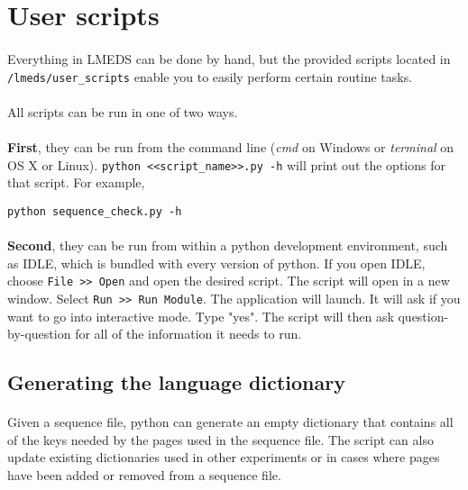 
\section{User scripts}
\label{users_scripts}

\paragraph{}
Everything in LMEDS can be done by hand, but the provided scripts located in \texttt{/lmeds/user\_scripts} enable you to easily perform certain routine tasks.

\paragraph{}
All scripts can be run in one of two ways.  

\paragraph{}
\textbf{First}, they can be run from the command line (\textit{cmd} on Windows or \textit{terminal} on OS X or Linux).  \texttt{python <<script\_name>>.py -h} will print out the options for that script.  For example, 
\begin{lstlisting}
python sequence_check.py -h
\end{lstlisting}

\paragraph{}
\textbf{Second}, they can be run from within a python development environment, such as IDLE, which is bundled with every version of python.  If you open IDLE, choose \texttt{File >> Open} and open the desired script.  The script will open in a new window.  Select \texttt{Run >> Run Module}.  The application will launch.  It will ask if you want to go into interactive mode.  Type "yes".  The script will then ask question-by-question for all of the information it needs to run.

\subsection{Generating the language dictionary}

\paragraph{}
Given a sequence file, python can generate an empty dictionary that contains all of the keys needed by the pages used in the sequence file.  The script can also update existing dictionaries used in other experiments or in cases where pages have been added or removed from a sequence file.

